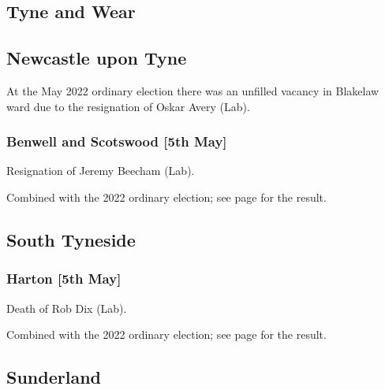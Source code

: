 \documentclass[a4paper,openany]{book}
\begin{document}
\begin{resultsiii}
\section{Tyne and Wear}

\subsection*{Newcastle upon Tyne}

At the May 2022 ordinary election there was an unfilled vacancy in Blakelaw ward due to the resignation of Oskar Avery (Lab).%

\subsubsection*{Benwell and Scotswood \hspace*{\fill}\nolinebreak[1]%
	\enspace\hspace*{\fill}
	[5th May]}


Resignation of Jeremy Beecham (Lab).

Combined with the 2022 ordinary election; see page \pageref{NewcastleTyneBenwellScotswood} for the result.

\subsection*{South Tyneside}

\subsubsection*{Harton \hspace*{\fill}\nolinebreak[1]%
	\enspace\hspace*{\fill}
	[5th May]}


Death of Rob Dix (Lab).

Combined with the 2022 ordinary election; see page \pageref{SouthTynesideHarton} for the result.

\subsection*{Sunderland}


\end{resultsiii}
\end{document}
